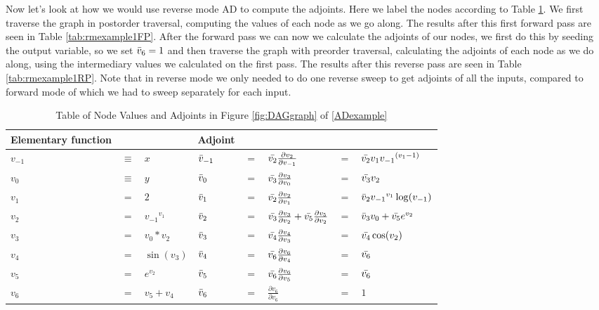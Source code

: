 \documentclass{article}
\begin{document}
Now let's look at how we would use reverse mode AD to compute the adjoints. Here we label the nodes according to Table \ref{tab:rmexample1}. We first traverse the graph in postorder traversal, computing the values of each node as we go along. The results after this first forward pass are seen in Table \ref{tab:rmexample1FP}. After the forward pass we can now we calculate the adjoints of our nodes, we first do this by seeding the output variable, so we set $\Bar{v}_6 = 1$ and then traverse the graph with preorder traversal, calculating the adjoints of each node as we do along, using the intermediary values we calculated on the first pass. The results after this reverse pass are seen in Table \ref{tab:rmexample1RP}. Note that in reverse mode we only needed to do one reverse sweep to get adjoints of all the inputs, compared to forward mode of which we had to sweep separately for each input.

\begin{table}[h!]
    \centering
    \begin{tabular}{|lcl|lclll|}
        \hline
        Elementary function & & & Adjoint & & & &\\
        \hline
        $v_{-1}$ & $\equiv$ & $x$ & $\Bar{v}_{-1}$ & $=$ & $\Bar{v_2}\frac{\partial{v_2}}{\partial{v_{-1}}}$ & $=$ & $\Bar{v_2}v_1 {v_{-1}}^{(v_{1}-1)}$\\
        $v_{0}$ & $\equiv$ & $y$ & $\Bar{v}_{0}$ & $=$ & $\Bar{v_3}\frac{\partial{v_3}}{\partial{v_0}}$ & $=$ & $\Bar{v_3}v_2$\\
        \hline
        $v_{1}$ & $=$ & $2$ & $\Bar{v}_{1}$ & $=$ & $\Bar{v_2}\frac{\partial{v_2}}{\partial{v_1}}$ & $=$ & $\Bar{v}_{2}{v_{-1}}^{v_{1}}\log(v_{-1})$\\
        $v_{2}$ & $=$ & ${v_{-1}}^{v_{1}}$ & $\Bar{v}_{2}$ & $=$ & $\Bar{v_3}\frac{\partial{v_3}}{\partial{v_2}} + \Bar{v_5}\frac{\partial{v_5}}{\partial{v_2}}$ & $=$ & $\Bar{v}_{3}v_0 + \Bar{v_5}e^{v_2}$\\
        $v_{3}$ & $=$ & ${v_{0}}*{v_{2}}$ & $\Bar{v}_{3}$ & $=$ & $\Bar{v_4}\frac{\partial{v_4}}{\partial{v_3}}$ & $=$ & $\Bar{v_4}\cos(v_2)$\\
        $v_{4}$ & $=$ & $\sin(v_3)$ & $\Bar{v}_{4}$ & $=$ & $\Bar{v_6}\frac{\partial{v_6}}{\partial{v_4}}$ & $=$ & $\Bar{v_6}$\\
        $v_{5}$ & $=$ & $e^{v_2}$ & $\Bar{v}_{5}$ & $=$ & $\Bar{v_6}\frac{\partial{v_6}}{\partial{v_5}}$ & $=$ & $\Bar{v_6}$\\
        \hline
        $v_{6}$ & $=$ & $v_5 + v_4$ & $\Bar{v}_{6}$ & $=$ & $\frac{\partial{v_6}}{\partial{v_6}}$ & $=$ & $1$\\
        \hline
    \end{tabular}
    \caption{Table of Node Values and Adjoints in Figure \ref{fig:DAGgraph} of \eqref{ADexample}}
    \label{tab:rmexample1}
\end{table}
\end{document}
